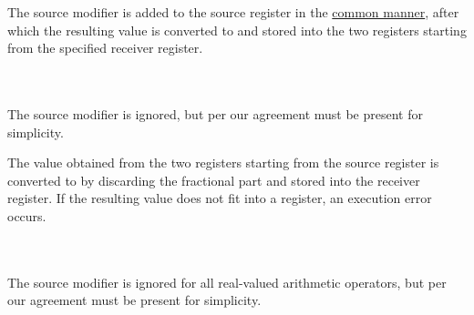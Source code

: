 The source modifier is added to the source register in
the \hyperlink{types:twos_complement}{common manner}, after which the resulting
 value is converted to  and stored into the two registers
starting from the specified receiver register.

\vspace{-0.35cm}
\paragraph{}\

The source modifier is ignored, but per our agreement must be present for simplicity.

The  value obtained from the two registers starting from the source
register is converted to  by discarding the fractional part
and stored into the receiver register.
If the resulting value does not fit into a register, an execution error occurs.

\vspace{-0.35cm}
\paragraph{}\

The source modifier is ignored for all real-valued arithmetic operators,
but per our agreement must be present for simplicity.
